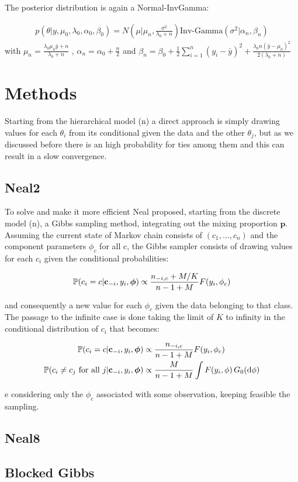 The posterior distribution is again a Normal-InvGamma:

\begin{align}
          p(\theta|y,\mu_0,\lambda_0, \alpha_0, \beta_0)=N\left(\mu | \mu_n ,\frac{\sigma^2} {\lambda_0 + n}\right)\text{Inv-Gamma}(\sigma^2|\alpha_n, \beta_n )
\end{align}
with $\mu_n=\frac{\lambda_0 \mu_0 \bar{y} + n}{\lambda_0 + n}$ , $\alpha_n= \alpha_0 + \frac{n}{2} $ and $\beta_n= \beta_0 + \frac{1}{2}\sum_{i=1}^{n} (y_i-\bar{y})^2 + \frac{\lambda_0 n(\bar{y}-\mu_0)^2}{2(\lambda_0 + n)}$

\section{Methods}
 
Starting from the hierarchical model (n) a direct approach is simply drawing values for each $\theta_i$ from its conditional given the data and the other $\theta_j$, but as we discussed before there is an high probability for ties among them and this can result in a slow convergence. 

\subsection{Neal2}

To solve and make it more efficient Neal proposed, starting from the discrete model (n), a Gibbs sampling method, integrating out the mixing proportion $\textbf{p}$. Assuming the current state of Markov chain consists of $(c_1,...,c_n)$  and the component parameters $\phi_c$ for all c, the Gibbs sampler consists of drawing values for each $c_i$ given the conditional probabilities:


\begin{align*}
			\mathbb P(c_{i}=c | \mathbf c_{-i}, y_{i},\boldsymbol\phi) \propto \frac{n_{-i,c} + M/{K}}{n-1+M} F(y_{i},\phi_{c}) 
\end{align*}

and consequently a new value for each $\phi_c$ given the data belonging to that class. The passage to the infinite case is done taking the limit of $K$ to infinity in the conditional distribution of $c_i$ that becomes:


\begin{align*}
			\mathbb P(c_{i}=c | \mathbf c_{-i}, y_{i},\boldsymbol\phi) &\propto \frac{n_{-i,c} }{n-1+M} F(y_{i},\phi_{c}) \\
			\mathbb P(c_{i}\neq c_{j} \text{ for all } j | \mathbf c_{-i}, y_{i},\boldsymbol\phi) &\propto \frac{M }{n-1+M} \int F(y_{i},\phi) \, G_0(\mathrm d\phi)
\end{align*}

e considering only the $\phi_c$ associated with some observation, keeping feasible the sampling. 


\subsection{Neal8}

\subsection{Blocked Gibbs}
